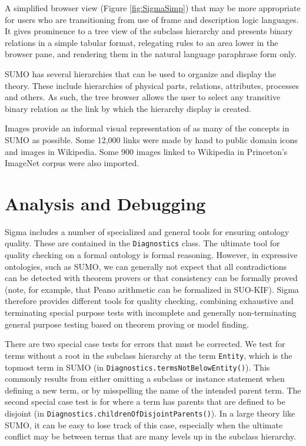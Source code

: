 \documentclass{book}
\begin{document}
A simplified browser view (Figure \ref{fig:SigmaSimp}) that may
be more appropriate for users who are transitioning from use of frame and
description logic languages.  It gives prominence to a
tree view of the subclass hierarchy and presents binary relations in a simple
tabular format, relegating rules to an area lower in the browser pane, and
rendering them in the natural language paraphrase form only.

SUMO has several hierarchies that can be used to organize and display the
theory.  These include hierarchies of physical parts, relations, attributes,
processes and others.  As such, the tree browser allows the user to select any
transitive binary relation as the link by
which the hierarchy display is created. 

Images provide an informal visual representation of as many of the concepts in
SUMO as possible.  Some 12,000 links were made by hand to public domain icons
and images in Wikipedia.  Some 900 images linked to Wikipedia in
Princeton's ImageNet \cite{deng2009} corpus were also imported.

\section{Analysis and Debugging}
\label{chap:KnowEngi:sec:Anal}

Sigma includes a number of specialized and general tools for ensuring ontology
quality. These are contained in the
\texttt{Diagnostics} class. The ultimate tool for
quality checking on a formal ontology is formal reasoning.  However, in
expressive ontologies, such as SUMO, we can generally not expect that all
contradictions can be detected with theorem provers or that
consistency can be formally proved (note, for example, that Peano arithmetic can
be formalized in SUO-KIF). Sigma
therefore provides different tools for quality checking, combining exhaustive
and terminating special purpose tests with incomplete and generally
non-terminating general purpose testing based on theorem proving or model
finding. 

There are two special case tests for errors that must be corrected.  We test for
terms without a root in the subclass hierarchy at the term {\tt Entity}, which
is the topmost term in SUMO (in \texttt{Diagnostics.termsNotBelowEntity()}).
This commonly results from either omitting a subclass or instance statement when
defining a new term, or by misspelling the name of the intended parent term. The
second special case test is for where a term has parents that are defined to be
disjoint (in \texttt{Diagnostics.childrenOfDisjointParents()}).  In a large
theory like SUMO, it can be easy to lose track of this case, especially when the
ultimate conflict may be between terms that are many levels up in the subclass
hierarchy.
\end{document}
